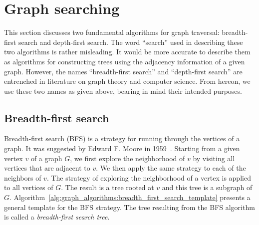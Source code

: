 
\section{Graph searching}


This section discusses two fundamental algorithms for graph traversal:
breadth-first search and depth-first search. The word ``search'' used
in describing these two algorithms is rather misleading. It would be
more accurate to describe them as algorithms for constructing trees
using the adjacency information of a given graph. However, the names
``breadth-first search'' and ``depth-first search'' are entrenched in
literature on graph theory and computer science. From hereon, we use
these two names as given above, bearing in mind their intended
purposes.



\subsection{Breadth-first search}

Breadth-first search (BFS) is a strategy for running through the
vertices of a graph. It was suggested by Edward F. Moore in
1959~\cite{Moore1959}. Starting from a given vertex $v$ of a graph
$G$, we first explore the neighborhood of $v$ by visiting all vertices
that are adjacent to $v$. We then apply the same strategy to each of
the neighbors of $v$. The strategy of exploring the neighborhood of a
vertex is applied to all vertices of $G$. The result is a tree rooted
at $v$ and this tree is a subgraph of
$G$. Algorithm~\ref{alg:graph_algorithms:breadth_first_search_template}
presents a general template for the BFS strategy. The tree resulting
from the BFS algorithm is called a \emph{breadth-first search tree}.

